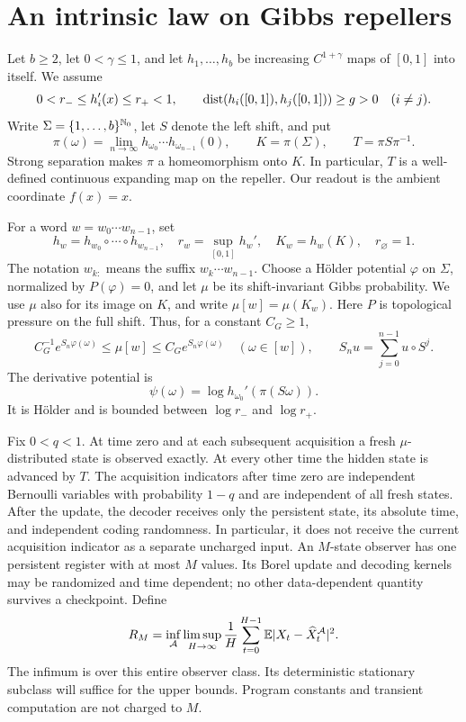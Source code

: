 \section{An intrinsic law on Gibbs repellers}\label{sec:v5-model}

Let $b\ge2$, let $0<\gamma\le1$, and let $h_1,\ldots,h_b$ be
increasing $C^{1+\gamma}$ maps of $[0,1]$ into itself. We assume
\begin{equation}\label{eq:v5-branches}
 0<r_-\le h_i'(x)\le r_+<1,
 \qquad \operatorname{dist}(h_i([0,1]),h_j([0,1]))\ge g>0\quad(i\ne j).
\end{equation}
Write $\Sigma=\{1,\ldots,b\}^{\mathbb N_0}$, let $S$ denote the left shift,
and put
\[
 \pi(\omega)=\lim_{n\to\infty}h_{\omega_0}\cdots h_{\omega_{n-1}}(0),
 \qquad K=\pi(\Sigma),\qquad T=\pi S\pi^{-1}.
\]
Strong separation makes $\pi$ a homeomorphism onto $K$. In particular,
$T$ is a well-defined continuous expanding map on the repeller. Our
readout is the ambient coordinate $f(x)=x$.

For a word $w=w_0\cdots w_{n-1}$, set
\[
 h_w=h_{w_0}\circ\cdots\circ h_{w_{n-1}},\quad
 r_w=\sup_{[0,1]}h_w',\quad K_w=h_w(K),\quad r_\varnothing=1.
\]
The notation $w_{k:}$ means the suffix $w_k\cdots w_{n-1}$.
Choose a H\"older potential $\varphi$ on $\Sigma$, normalized by
$P(\varphi)=0$, and let $\mu$ be its shift-invariant Gibbs probability.
We use $\mu$ also for its image on $K$, and write $\mu[w]=\mu(K_w)$.
Here $P$ is topological pressure on the full shift. Thus, for a constant
$C_G\ge1$,
\begin{equation}\label{eq:v5-gibbs}
 C_G^{-1}e^{S_n\varphi(\omega)}\le\mu[w]
 \le C_Ge^{S_n\varphi(\omega)}\quad(\omega\in[w]),
 \qquad S_nu=\sum_{j=0}^{n-1}u\circ S^j.
\end{equation}
The derivative potential is
\begin{equation}\label{eq:v5-psi}
 \psi(\omega)=\log h_{\omega_0}'(\pi(S\omega)).
\end{equation}
It is H\"older and is bounded between $\log r_-$ and $\log r_+$.

Fix $0<q<1$. At time zero and at each subsequent acquisition a fresh
$\mu$-distributed state is observed exactly. At every other time the
hidden state is advanced by $T$. The acquisition indicators after time
zero are independent Bernoulli variables with probability $1-q$ and
are independent of all fresh states. After the update, the decoder
receives only the persistent state, its absolute time, and independent
coding randomness. In particular, it does not receive the current
acquisition indicator as a separate uncharged input. An $M$-state
observer has one persistent register with at most $M$ values. Its
Borel update and decoding kernels may be randomized and time dependent;
no other data-dependent quantity survives a checkpoint. Define
\begin{equation}\label{eq:v5-risk}
 R_M=\inf_{\mathcal A}\limsup_{H\to\infty}\frac1H
       \sum_{t=0}^{H-1}\mathbb E|X_t-\widehat X_t^{\mathcal A}|^2.
\end{equation}
The infimum is over this entire observer class. Its deterministic
stationary subclass will suffice for the upper bounds. Program
constants and transient computation are not charged to $M$.

